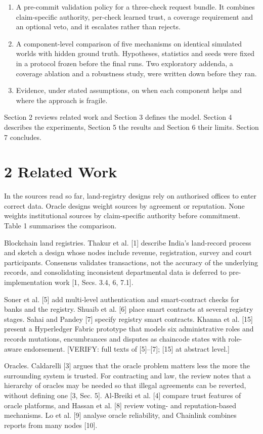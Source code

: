 \documentclass[10pt]{article}
\begin{document}
\begin{enumerate}
\item A pre-commit validation policy for a three-check request bundle. It combines claim-specific authority, per-check learned trust, a coverage requirement and an optional veto, and it escalates rather than rejects.
\item A component-level comparison of five mechanisms on identical simulated worlds with hidden ground truth. Hypotheses, statistics and seeds were fixed in a protocol frozen before the final runs. Two exploratory addenda, a coverage ablation and a robustness study, were written down before they ran.
\item Evidence, under stated assumptions, on when each component helps and where the approach is fragile.
\end{enumerate}
Section 2 reviews related work and Section 3 defines the model. Section 4 describes the experiments, Section 5 the results and Section 6 their limits. Section 7 concludes.

\section*{2 Related Work}
In the sources read so far, land-registry designs rely on authorised offices to enter correct data. Oracle designs weight sources by agreement or reputation. None weights institutional sources by claim-specific authority before commitment. Table 1 summarises the comparison.

Blockchain land registries. Thakur et al. [1] describe India's land-record process and sketch a design whose nodes include revenue, registration, survey and court participants. Consensus validates transactions, not the accuracy of the underlying records, and consolidating inconsistent departmental data is deferred to pre-implementation work [1, Secs. 3.4, 6, 7.1].

Soner et al. [5] add multi-level authentication and smart-contract checks for banks and the registry. Shuaib et al. [6] place smart contracts at several registry stages. Sahai and Pandey [7] specify registry smart contracts. Khanna et al. [15] present a Hyperledger Fabric prototype that models six administrative roles and records mutations, encumbrances and disputes as chaincode states with role-aware endorsement. [VERIFY: full texts of [5]–[7]; [15] at abstract level.]

Oracles. Caldarelli [3] argues that the oracle problem matters less the more the surrounding system is trusted. For contracting and law, the review notes that a hierarchy of oracles may be needed so that illegal agreements can be reverted, without defining one [3, Sec. 5]. Al-Breiki et al. [4] compare trust features of oracle platforms, and Hassan et al. [8] review voting- and reputation-based mechanisms. Lo et al. [9] analyse oracle reliability, and Chainlink combines reports from many nodes [10].
\end{document}
